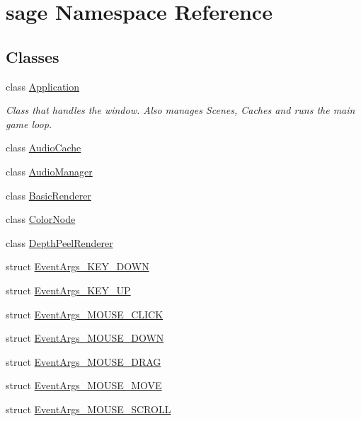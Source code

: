 \hypertarget{namespacesage}{}\section{sage Namespace Reference}
\label{namespacesage}
\subsection*{Classes}
\begin{DoxyCompactItemize}
\item 
class \mbox{\hyperlink{classsage_1_1Application}{Application}}
\begin{DoxyCompactList}\small\item\em Class that handles the window. Also manages Scenes, Caches and runs the main game loop. \end{DoxyCompactList}\item 
class \mbox{\hyperlink{classsage_1_1AudioCache}{Audio\+Cache}}
\item 
class \mbox{\hyperlink{classsage_1_1AudioManager}{Audio\+Manager}}
\item 
class \mbox{\hyperlink{classsage_1_1BasicRenderer}{Basic\+Renderer}}
\item 
class \mbox{\hyperlink{classsage_1_1ColorNode}{Color\+Node}}
\item 
class \mbox{\hyperlink{classsage_1_1DepthPeelRenderer}{Depth\+Peel\+Renderer}}
\item 
struct \mbox{\hyperlink{structsage_1_1EventArgs__KEY__DOWN}{Event\+Args\+\_\+\+K\+E\+Y\+\_\+\+D\+O\+WN}}
\item 
struct \mbox{\hyperlink{structsage_1_1EventArgs__KEY__UP}{Event\+Args\+\_\+\+K\+E\+Y\+\_\+\+UP}}
\item 
struct \mbox{\hyperlink{structsage_1_1EventArgs__MOUSE__CLICK}{Event\+Args\+\_\+\+M\+O\+U\+S\+E\+\_\+\+C\+L\+I\+CK}}
\item 
struct \mbox{\hyperlink{structsage_1_1EventArgs__MOUSE__DOWN}{Event\+Args\+\_\+\+M\+O\+U\+S\+E\+\_\+\+D\+O\+WN}}
\item 
struct \mbox{\hyperlink{structsage_1_1EventArgs__MOUSE__DRAG}{Event\+Args\+\_\+\+M\+O\+U\+S\+E\+\_\+\+D\+R\+AG}}
\item 
struct \mbox{\hyperlink{structsage_1_1EventArgs__MOUSE__MOVE}{Event\+Args\+\_\+\+M\+O\+U\+S\+E\+\_\+\+M\+O\+VE}}
\item 
struct \mbox{\hyperlink{structsage_1_1EventArgs__MOUSE__SCROLL}{Event\+Args\+\_\+\+M\+O\+U\+S\+E\+\_\+\+S\+C\+R\+O\+LL}}
\item 

\end{DoxyCompactItemize}
